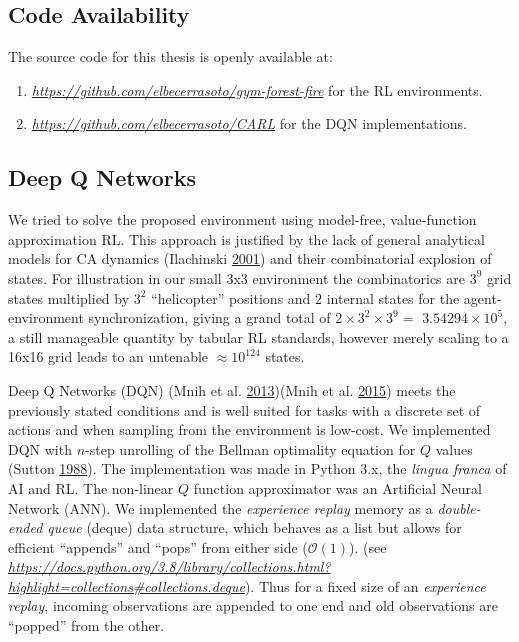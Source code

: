 \documentclass[
  openany]{book}
\providecommand{\tightlist}{%
  \setlength{\itemsep}{0pt}\setlength{\parskip}{0pt}}
\begin{document}
\hypertarget{code-availability}{%
\subsection{Code Availability}\label{code-availability}}

The source code for this thesis is openly available at:

\begin{enumerate}
\def\labelenumi{\arabic{enumi}.}
\tightlist
\item
  \emph{\url{https://github.com/elbecerrasoto/gym-forest-fire}} for the RL environments.
\item
  \emph{\url{https://github.com/elbecerrasoto/CARL}} for the DQN implementations.
\end{enumerate}

\hypertarget{deep-q-networks}{%
\subsection{Deep Q Networks}\label{deep-q-networks}}

We tried to solve the proposed environment using model-free, value-function approximation RL. This approach is justified by the lack of general analytical models for CA dynamics (Ilachinski \protect\hyperlink{ref-ilachinski2001cellular}{2001}) and their combinatorial explosion of states. For illustration in our small 3x3 environment the combinatorics are \(3^9\) grid states multiplied by \(3^2\) ``helicopter'' positions and \(2\) internal states for the agent-environment synchronization, giving a grand total of \(2 \times 3^2 \times 3^9 =\) \ensuremath{3.54294\times 10^{5}}, a still manageable quantity by tabular RL standards, however merely scaling to a 16x16 grid leads to an untenable \(\approx 10^{124}\) states.

Deep Q Networks (DQN) (Mnih et al. \protect\hyperlink{ref-mnih2013playing}{2013})(Mnih et al. \protect\hyperlink{ref-mnih2015human}{2015}) meets the previously stated conditions and is well suited for tasks with a discrete set of actions and when sampling from the environment is low-cost. We implemented DQN with \(n\)-step unrolling of the Bellman optimality equation for \(Q\) values (Sutton \protect\hyperlink{ref-sutton1988learning}{1988}). The implementation was made in Python 3.x, the \emph{lingua franca} of AI and RL. The non-linear \(Q\) function approximator was an Artificial Neural Network (ANN). We implemented the \emph{experience replay} memory as a \emph{double-ended queue} (deque) data structure, which behaves as a list but allows for efficient ``appends'' and ``pops'' from either side (\(\mathcal{O}(1)\)). (see \emph{\url{https://docs.python.org/3.8/library/collections.html?highlight=collections\#collections.deque}}). Thus for a fixed size of an \emph{experience replay}, incoming observations are appended to one end and old observations are ``popped'' from the other.
\end{document}
